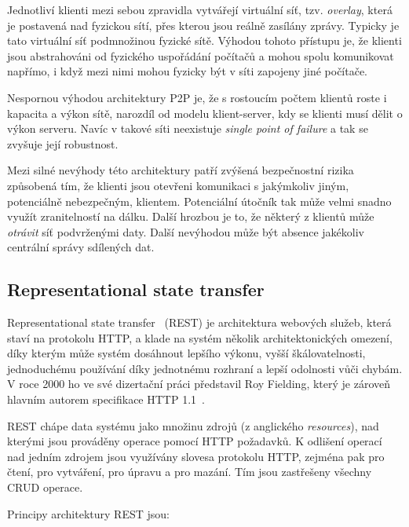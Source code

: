 Jednotliví klienti mezi sebou zpravidla vytvářejí virtuální síť, tzv. \textit{overlay},
která je postavená nad fyzickou sítí, přes kterou jsou reálně zasílány zprávy.
Typicky je tato virtuální síť podmnožinou fyzické sítě. Výhodou tohoto přístupu je,
že klienti jsou abstrahováni od fyzického uspořádání počítačů a mohou spolu komunikovat napřímo,
i když mezi nimi mohou fyzicky být v síti zapojeny jiné počítače.

Nespornou výhodou architektury \gls{P2P} je, že s rostoucím počtem klientů roste i
kapacita a výkon sítě, narozdíl od modelu klient-server, kdy se klienti musí dělit o výkon serveru.
Navíc v takové síti neexistuje \textit{single point of failure} a tak se zvyšuje její robustnost.

Mezi silné nevýhody této architektury patří zvýšená bezpečnostní rizika způsobená tím,
že klienti jsou otevřeni komunikaci s jakýmkoliv jiným, potenciálně nebezpečným, klientem.
Potenciální útočník tak může velmi snadno využít zranitelností na dálku.
Další hrozbou je to, že některý z klientů může \textit{otrávit} síť podvrženými daty.
Další nevýhodou může být absence jakékoliv centrální správy sdílených dat.

\subsection{Representational state transfer}\label{sec:rest}

Representational state transfer~\cite{fielding2000rest} (\gls{REST}) je architektura
webových služeb, která staví na protokolu \gls{HTTP}, a klade na systém
několik architektonických omezení, díky kterým může systém dosáhnout
lepšího výkonu, vyšší škálovatelnosti, jednoduchému používání díky jednotnému rozhraní
a lepší odolnosti vůči chybám. V roce 2000 ho ve své dizertační práci představil Roy Fielding,
který je zároveň hlavním autorem specifikace \gls{HTTP} 1.1~\cite{fielding1999hypertext}.

\gls{REST} chápe data systému jako množinu zdrojů (z anglického \textit{resources}),
nad kterými jsou prováděny operace pomocí \gls{HTTP} požadavků. K odlišení operací
nad jedním zdrojem jsou využívány slovesa protokolu \gls{HTTP}, zejména pak  pro čtení,
 pro vytváření,  pro úpravu a  pro mazání. Tím jsou zastřešeny
všechny \gls{CRUD} operace.

Principy architektury \gls{REST} jsou:

